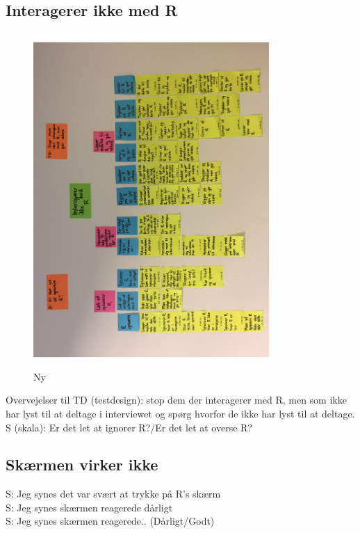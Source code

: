 \subsection{Interagerer ikke med R}
%
\begin{figure}[H]
\centering
\includegraphics[width = 0.8\textwidth, angle = -90]{Figure/AffinityDiagram/InteragererIkkeMedR} 
\caption{Ny}
\label{fig:AFInteragererIkkeMedR}
\end{figure}
\noindent
%
Overvejelser til TD (testdesign): stop dem der interagerer med R, men som ikke har lyst til at deltage i interviewet og spørg hvorfor de ikke har lyst til at deltage. \\
S (skala): Er det let at ignorer R?/Er det let at overse R?

\subsection{Skærmen virker ikke}
%
S: Jeg synes det var svært at trykke på R's skærm\\
S: Jeg synes skærmen reagerede dårligt\\
S: Jeg synes skærmen reagerede.. (Dårligt/Godt)\\

